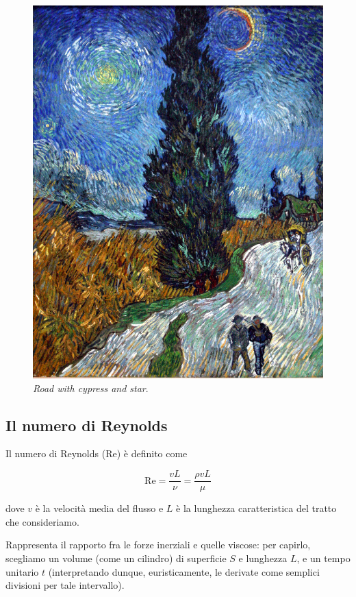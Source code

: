 \documentclass[12pt,a4paper]{article}
\numberwithin{equation}{section}
\begin{document}
\begin{figure}
    \centering
    \includegraphics[scale=0.12]{road_cypress.jpg}
    \caption{\emph{Road with cypress and star}.}
    \label{road}
\end{figure}


\subsection{Il numero di Reynolds}

Il numero di Reynolds ($\text{Re}$) è definito come

\begin{equation}
\text{Re} = \frac{v L}{\nu} = \frac{\rho v L}{\mu}
\end{equation}

dove $v$ è la velocità media del flusso e $L$ è la lunghezza caratteristica del tratto che consideriamo.

Rappresenta il rapporto fra le forze inerziali e quelle viscose: per capirlo, scegliamo un volume (come un cilindro) di superficie $S$ e lunghezza $L$, e un tempo unitario $t$ (interpretando dunque, euristicamente, le derivate come semplici divisioni per tale intervallo).
\end{document}
